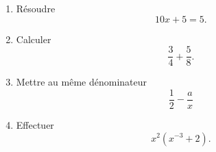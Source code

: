 
\begin{exercice}\label{exoPremiere-0021}

    \begin{enumerate}
        \item
            Résoudre
            \begin{equation}
                10x+5=5.
            \end{equation}
        \item
            Calculer
            \begin{equation}
                \frac{ 3 }{ 4 }+\frac{ 5 }{ 8 }.
            \end{equation}
        \item
            Mettre au même dénominateur
            \begin{equation}
                \frac{ 1 }{ 2 }-\frac{ a }{ x }
            \end{equation}
        \item
            Effectuer
            \begin{equation}
                x^2(x^{-3}+2).
            \end{equation}
    \end{enumerate}

\end{exercice}
